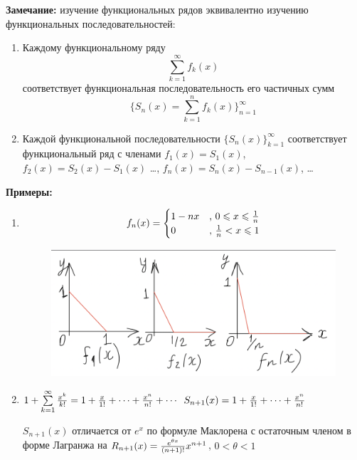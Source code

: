 \documentclass[a4paper,12pt]{article} %
\renewcommand {\leq}{\leqslant}
\begin{document}
\textbf{Замечание:} изучение функциональных рядов эквивалентно изучению функциональных последовательностей:\newline
\begin{enumerate}
    \item Каждому функциональному ряду $${\sum\limits_{k = 1}^{\infty}}f_k(x)$$ соответствует функциональная последовательность его частичных сумм $$\{S_n(x) = \sum\limits_{k = 1}^{n}f_k(x)\}_{n=1}^\infty$$ 
   \item Каждой функциональной последовательности $\{S_n(x)\}_{k=1}^\infty$ соответствует функциональный ряд с членами $f_1(x) = S_1(x)$, $f_2(x) = S_2(x) - S_1(x)$ \dots, $f_n(x) = S_n(x) - S_{n-1}(x)$, \dots 
   
\end{enumerate}

\noindent \textbf{Примеры:}
\begin{enumerate}
    
    \item 
\begin{equation*}
f_n(x) = 
 \begin{cases}
   1-nx &\text{, $0 \leq x \leq {1 \over n}$}\\
   0 &\text{, ${1\over n}< x\leq 1$}
 \end{cases}
\end{equation*}

\begin{figure}[h!]
    \centering
    \includegraphics[scale = 0.5]{10_bilet_primer1.png}
\end{figure}

    \item
    $1 + \sum\limits_{k=1}^\infty {x^k \over k!}  = 1 + {x\over 1!} + \cdots + {x^n \over n!} + \cdots$ \newline
    $S_{n+1}(x) = 1 + {x\over 1!} + \cdots + {x^n \over n!}$ \newline
    
    $S_{n+1}(x)$ отличается от $e^x$ по формуле Маклорена с остаточным членом в форме Лагранжа на $R_{n+1}(x)= {e^{\theta x}\over {(n+1)!}} x^{n+1}$,  $0 < \theta < 1$
\end{enumerate}
\end{document}
